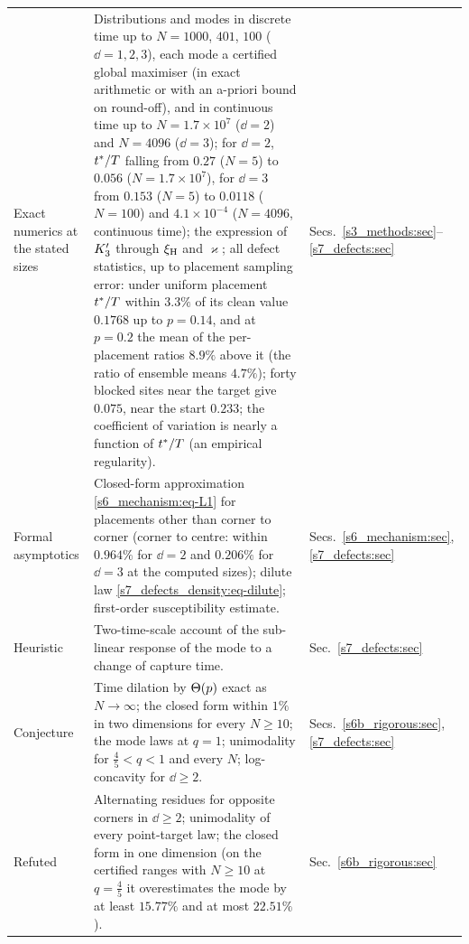 {\begin{longtable}{@{}p{2.4cm}p{10.6cm}p{2.1cm}@{}}
\addlinespace
\raggedright Exact numerics at the stated sizes &
Distributions and modes in discrete time up to $N=1000$, $401$, $100$ ($\dd=1,2,3$), each mode a certified global
maximiser (in exact arithmetic or with an a-priori bound on round-off), and in continuous time up to $N=1.7\times10^{7}$ ($\dd=2$) and $N=4096$ ($\dd=3$); for $\dd=2$, $t^{*}/T$
falling from $0.27$ ($N=5$) to $0.056$ ($N=1.7\times10^{7}$), for $\dd=3$ from $0.153$ ($N=5$) to $0.0118$ ($N=100$) and
$4.1\times10^{-4}$ ($N=4096$, continuous time); the
expression of $K_{3}'$ through $\xi_{\mathrm{H}}$ and $\varkappa$; all defect statistics, up to placement sampling error: under
uniform placement $t^{*}/T$ within $3.3\%$ of its clean value $0.1768$ up to $p=0.14$, and at $p=0.2$ the mean of
the per-placement ratios $8.9\%$ above it (the ratio of ensemble means $4.7\%$); forty blocked sites near the target give
$0.075$, near the start $0.233$; the coefficient of variation is nearly a function of $t^{*}/T$ (an empirical
regularity).
& \raggedright Secs.~\ref{s3_methods:sec}--\ref{s7_defects:sec} \tabularnewline
\addlinespace
\raggedright Formal asymptotics &
Closed-form approximation \eqref{s6_mechanism:eq-L1} for placements other than corner to corner (corner to centre:
within $0.964\%$ for $\dd=2$ and $0.206\%$ for $\dd=3$ at the computed sizes); dilute law \eqref{s7_defects_density:eq-dilute};
first-order susceptibility estimate.
& \raggedright Secs.~\ref{s6_mechanism:sec}, \ref{s7_defects:sec} \tabularnewline
\addlinespace
Heuristic &
Two-time-scale account of the sub-linear response of the mode to a change of capture time.
& Sec.~\ref{s7_defects:sec} \tabularnewline
\addlinespace
Conjecture &
Time dilation by $\Theta(p)$ exact as $N\to\infty$; the closed form within $1\%$ in two dimensions for every $N\ge10$;
the mode laws at $q=1$; unimodality for $\frac45<q<1$ and every $N$; log-concavity for $\dd\ge2$.
& \raggedright Secs.~\ref{s6b_rigorous:sec}, \ref{s7_defects:sec} \tabularnewline
\addlinespace
Refuted &
Alternating residues for opposite corners in $\dd\ge2$; unimodality of every point-target law; the closed form in one
dimension (on the certified ranges with $N\ge10$ at $q=\frac45$ it overestimates the mode by at least $15.77\%$ and at
most $22.51\%$).
& Sec.~\ref{s6b_rigorous:sec} \tabularnewline
\bottomrule
\end{longtable}}


